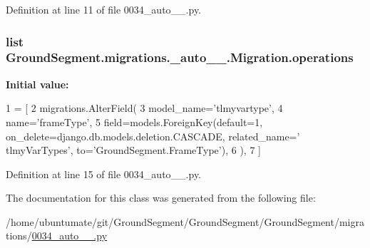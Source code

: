 Definition at line 11 of file 0034\+\_\+auto\+\_\+\_.\+py.

\hypertarget{class_ground_segment_1_1migrations_1_10034__auto__20170130__1320_1_1_migration_a4ca864875769777007ba49b4187764b7}{}
\subsubsection[{operations}]{\setlength{\rightskip}{0pt plus 5cm}list Ground\+Segment.\+migrations.\+\_\+auto\+\_\+\_.\+Migration.\+operations\hspace{0.3cm}{\ttfamily [static]}}\label{class_ground_segment_1_1migrations_1_10034__auto__20170130__1320_1_1_migration_a4ca864875769777007ba49b4187764b7}
{\bfseries Initial value\+:}
\begin{DoxyCode}
1 = [
2         migrations.AlterField(
3             model\_name=\textcolor{stringliteral}{'tlmyvartype'},
4             name=\textcolor{stringliteral}{'frameType'},
5             field=models.ForeignKey(default=1, on\_delete=django.db.models.deletion.CASCADE, related\_name=\textcolor{stringliteral}{'
      tlmyVarTypes'}, to=\textcolor{stringliteral}{'GroundSegment.FrameType'}),
6         ),
7     ]
\end{DoxyCode}


Definition at line 15 of file 0034\+\_\+auto\+\_\+\_.\+py.



The documentation for this class was generated from the following file\+:\begin{DoxyCompactItemize}
\item 
/home/ubuntumate/git/\+Ground\+Segment/\+Ground\+Segment/\+Ground\+Segment/migrations/\hyperlink{0034__auto__20170130__1320_8py}{0034\+\_\+auto\+\_\+\_.\+py}\end{DoxyCompactItemize}
